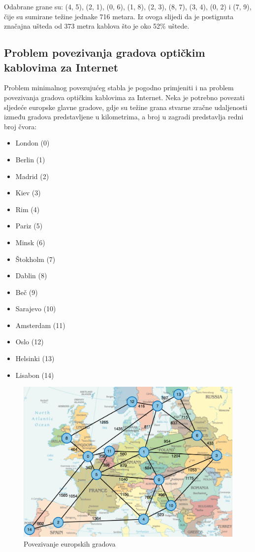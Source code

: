 \documentclass[conference]{IEEEtran}
\begin{document}
Odabrane grane su: (4, 5), (2, 1), (0, 6), (1, 8), (2, 3), (8, 7), (3, 4), (0, 2) i (7, 9), čije su sumirane težine jednake 716 metara. Iz ovoga slijedi da je postignuta značajna ušteda od 373
metra kablova što je oko 52\% uštede.
\subsection{Problem povezivanja gradova optičkim kablovima za Internet}

Problem minimalnog povezujućeg stabla je pogodno primjeniti i na problem povezivanja gradova optičkim kablovima za Internet. Neka je potrebno povezati sljedeće europske glavne gradove, gdje su težine grana stvarne zračne udaljenosti između gradova predstavljene u kilometrima, a broj u zagradi predstavlja redni broj čvora:
\begin{multicols}{2}
    \begin{itemize}
        \item London (0)
        \item Berlin (1)
        \item Madrid (2)
        \item Kiev (3)
        \item Rim (4)
        \item Pariz (5)
        \item Minsk (6)
        \item Štokholm (7)
        \item Dablin (8)
        \item Beč (9)
        \item Sarajevo (10)
        \item Amsterdam (11)
        \item Oslo (12)
        \item Helsinki (13)
        \item Lisabon (14)
    \end{itemize}
    \end{multicols}

\begin{figure}[H]
\centering
\includegraphics[width=1\linewidth]{slike/gradovi.png}
\caption{Povezivanje europskih gradova}
\label{figmat}
\end{figure}
\end{document}
